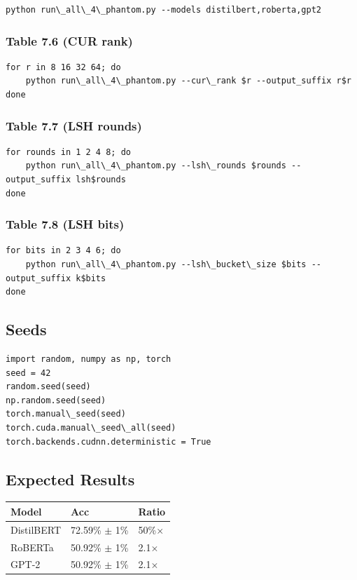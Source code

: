 \begin{lstlisting}
python run\_all\_4\_phantom.py --models distilbert,roberta,gpt2
\end{lstlisting}

\subsubsection{Table 7.6 (CUR rank)}

\begin{lstlisting}
for r in 8 16 32 64; do
    python run\_all\_4\_phantom.py --cur\_rank $r --output_suffix r$r
done
\end{lstlisting}

\subsubsection{Table 7.7 (LSH rounds)}

\begin{lstlisting}
for rounds in 1 2 4 8; do
    python run\_all\_4\_phantom.py --lsh\_rounds $rounds --output_suffix lsh$rounds
done
\end{lstlisting}

\subsubsection{Table 7.8 (LSH bits)}

\begin{lstlisting}
for bits in 2 3 4 6; do
    python run\_all\_4\_phantom.py --lsh\_bucket\_size $bits --output_suffix k$bits
done
\end{lstlisting}

\subsection{Seeds}

\begin{lstlisting}
import random, numpy as np, torch
seed = 42
random.seed(seed)
np.random.seed(seed)
torch.manual\_seed(seed)
torch.cuda.manual\_seed\_all(seed)
torch.backends.cudnn.deterministic = True
\end{lstlisting}

\subsection{Expected Results}

\begin{table}[H]
\centering
\small
\begin{tabular}{lll}
\toprule
\textbf{Model} & \textbf{Acc} & \textbf{Ratio} \\
\midrule
DistilBERT & 72.59\% $\pm$ 1\% & 50\%$\times$ \\
RoBERTa & 50.92\% $\pm$ 1\% & 2.1$\times$ \\
GPT-2 & 50.92\% $\pm$ 1\% & 2.1$\times$ \\
\bottomrule
\end{tabular}
\end{table}

